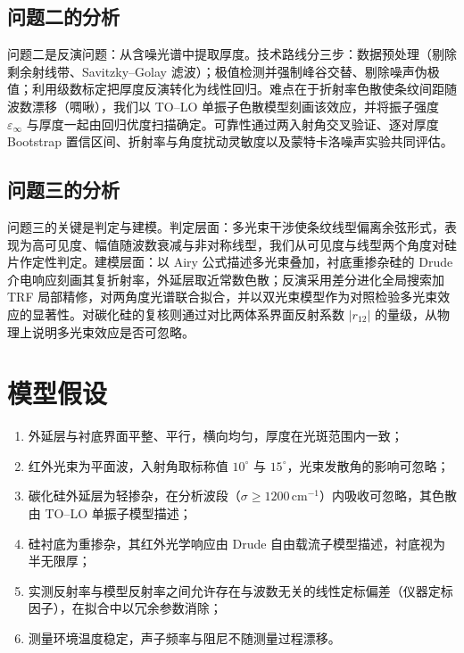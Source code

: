 \documentclass[11pt,a4paper,fontset=fandol]{ctexart}
\newcommand{\invcm}{\,\mathrm{cm^{-1}}}
\begin{document}
\subsection{问题二的分析}
问题二是反演问题：从含噪光谱中提取厚度。技术路线分三步：数据预处理（剔除剩余射线带、Savitzky--Golay 滤波）；极值检测并强制峰谷交替、剔除噪声伪极值；利用级数标定把厚度反演转化为线性回归。难点在于折射率色散使条纹间距随波数漂移（啁啾），我们以 TO--LO 单振子色散模型刻画该效应，并将振子强度 $\varepsilon_\infty$ 与厚度一起由回归优度扫描确定。可靠性通过两入射角交叉验证、逐对厚度 Bootstrap 置信区间、折射率与角度扰动灵敏度以及蒙特卡洛噪声实验共同评估。

\subsection{问题三的分析}
问题三的关键是判定与建模。判定层面：多光束干涉使条纹线型偏离余弦形式，表现为高可见度、幅值随波数衰减与非对称线型，我们从可见度与线型两个角度对硅片作定性判定。建模层面：以 Airy 公式描述多光束叠加，衬底重掺杂硅的 Drude 介电响应刻画其复折射率，外延层取近常数色散；反演采用差分进化全局搜索加 TRF 局部精修，对两角度光谱联合拟合，并以双光束模型作为对照检验多光束效应的显著性。对碳化硅的复核则通过对比两体系界面反射系数 $|r_{12}|$ 的量级，从物理上说明多光束效应是否可忽略。

\section{模型假设}
\begin{enumerate}[label=\textbf{假设\arabic*：}, leftmargin=3.6em, itemsep=0.15em]
    \item 外延层与衬底界面平整、平行，横向均匀，厚度在光斑范围内一致；
    \item 红外光束为平面波，入射角取标称值 $10^\circ$ 与 $15^\circ$，光束发散角的影响可忽略；
    \item 碳化硅外延层为轻掺杂，在分析波段（$\sigma\ge1200\invcm$）内吸收可忽略，其色散由 TO--LO 单振子模型描述；
    \item 硅衬底为重掺杂，其红外光学响应由 Drude 自由载流子模型描述，衬底视为半无限厚；
    \item 实测反射率与模型反射率之间允许存在与波数无关的线性定标偏差（仪器定标因子），在拟合中以冗余参数消除；
    \item 测量环境温度稳定，声子频率与阻尼不随测量过程漂移。
\end{enumerate}
\end{document}

